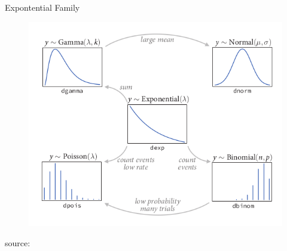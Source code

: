 \documentclass[handout]{beamer}
\begin{document}
\begin{frame}{Expontential Family}
\scriptsize{

\begin{figure}[h!]
	\centering
	\includegraphics[scale=0.45]{pics/expfamily.png}
\end{figure}
source: \cite{mcelreath2020statistical}

}

\end{frame}
\end{document}
